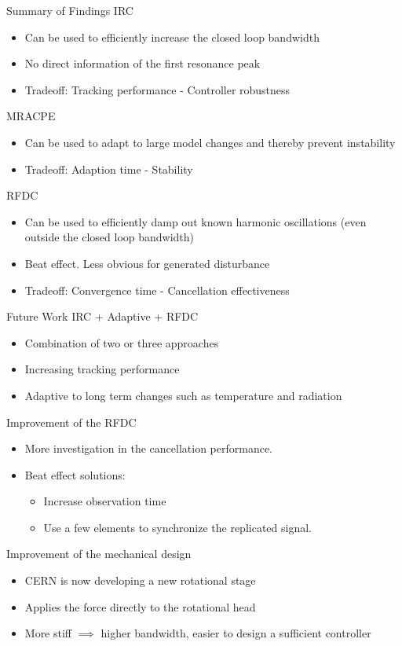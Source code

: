 \documentclass[10pt]{beamer}
\begin{document}
\begin{frame}{Summary of Findings}
  IRC
  \begin{itemize}
    \item  Can be used to efficiently increase the closed loop bandwidth
    \item  No direct information of the first resonance peak
    \item  Tradeoff: Tracking performance - Controller robustness
  \end{itemize}
  MRACPE
  \begin{itemize}
    \item Can be used to adapt to large model changes and thereby prevent instability
    \item Tradeoff: Adaption time - Stability
  \end{itemize}
  RFDC
  \begin{itemize}
    \item Can be used to efficiently damp out known harmonic oscillations (even outside the closed loop bandwidth)
    \item Beat effect. Less obvious for generated disturbance
    \item Tradeoff: Convergence time - Cancellation effectiveness
  \end{itemize}
\end{frame}

\begin{frame}{Future Work}
  IRC + Adaptive + RFDC
  \begin{itemize}
    \item Combination of two or three approaches
    \item Increasing tracking performance
    \item Adaptive to long term changes such as temperature and radiation
  \end{itemize}
  Improvement of the RFDC
  \begin{itemize}
    \item More investigation in the cancellation performance.
    \item Beat effect solutions:
    \begin{itemize}
      \item Increase observation time
      \item Use a few elements to synchronize the replicated signal.
    \end{itemize}
  \end{itemize}
  Improvement of the mechanical design
  \begin{itemize}
    \item CERN is now developing a new rotational stage
    \item Applies the force directly to the rotational head
    \item More stiff $\implies$ higher bandwidth, easier to design a sufficient controller
  \end{itemize}
\end{frame}
\end{document}
